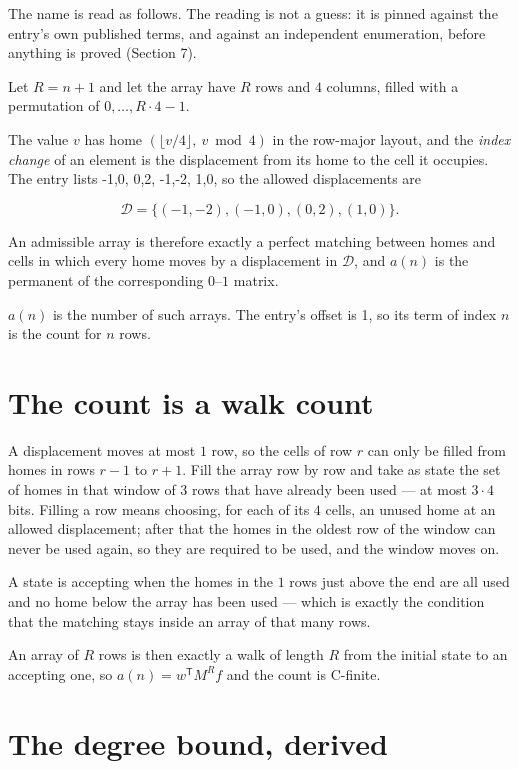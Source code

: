\documentclass[11pt]{article}
\theoremstyle{definition}
\begin{document}
The name is read as follows. The reading is not a guess: it is pinned against the entry's own published terms, and against an independent enumeration, before anything is proved (Section 7).

Let $R = n + 1$ and let the array have $R$ rows and $4$ columns, filled with a permutation of $0,\dots,R\cdot4-1$.

The value $v$ has home $(\lfloor v/4\rfloor,\ v \bmod 4)$ in the row-major layout, and the {\itshape index change} of an element is the displacement from its home to the cell it occupies. The entry lists -1,0, 0,2, -1,-2, 1,0, so the allowed displacements are

\[\mathcal{D} = \{(-1,-2), (-1,0), (0,2), (1,0)\}.\]

An admissible array is therefore exactly a perfect matching between homes and cells in which every home moves by a displacement in $\mathcal{D}$, and $a(n)$ is the permanent of the corresponding $0$--$1$ matrix.

$a(n)$ is the number of such arrays. The entry's offset is 1, so its term of index $n$ is the count for $n$ rows.

\section{The count is a walk count}

A displacement moves at most $1$ row, so the cells of row $r$ can only be filled from homes in rows $r-1$ to $r+1$. Fill the array row by row and take as state the set of homes in that window of $3$ rows that have already been used --- at most $3\cdot4$ bits. Filling a row means choosing, for each of its $4$ cells, an unused home at an allowed displacement; after that the homes in the oldest row of the window can never be used again, so they are required to be used, and the window moves on.

A state is accepting when the homes in the $1$ rows just above the end are all used and no home below the array has been used --- which is exactly the condition that the matching stays inside an array of that many rows.

An array of $R$ rows is then exactly a walk of length $R$ from the initial state to an accepting one, so $a(n) = w^{\mathsf T}M^{R}f$ and the count is C-finite.

\section{The degree bound, derived}
\end{document}
